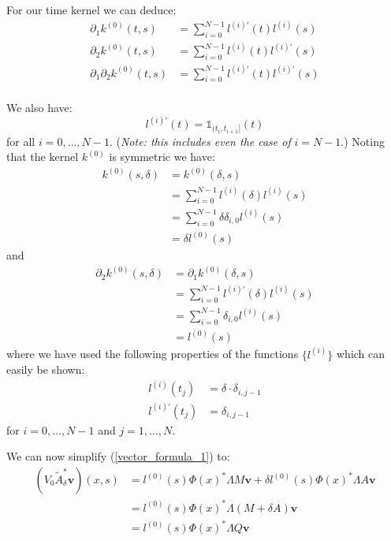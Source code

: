 \documentclass{article}
\theoremstyle{definition}
\theoremstyle{remark}
\theoremstyle{remark}
\begin{document}
\noindent For our time kernel we can deduce:
\begin{align}
    \partial_{1}k^{(0)}(t,s) &= \sum_{i=0}^{N-1}l^{(i)\prime}(t)l^{(i)}(s) \\
    \partial_{2}k^{(0)}(t,s) &= \sum_{i=0}^{N-1}l^{(i)}(t)l^{(i)\prime}(s) \\
    \partial_{1}\partial_{2}k^{(0)}(t,s) &= \sum_{i=0}^{N-1}l^{(i)\prime}(t)l^{(i)\prime}(s) \\
\end{align}

\noindent We also have:
\begin{equation}
    l^{(i)\prime}(t)=\mathbb{1}_{(t_{i},t_{i+1}]}(t)
\end{equation}
for all $i=0,\dots,N-1$. (\textit{Note: this includes even the case of } $i=N-1$.) Noting that the kernel $k^{(0)}$ is symmetric we have:
\begin{align*}
    k^{(0)}(s,\delta) &= k^{(0)}(\delta,s) \\
    &= \sum_{i=0}^{N-1}l^{(i)}(\delta)l^{(i)}(s) \\
    &= \sum_{i=0}^{N-1}\delta \delta_{i,0}l^{(i)}(s) \\
    &= \delta l^{(0)}(s)
\end{align*}
and
\begin{align*}
    \partial_{2}k^{(0)}(s,\delta) &= \partial_{1}k^{(0)}(\delta,s) \\
    &=\sum_{i=0}^{N-1}l^{(i)\prime}(\delta)l^{(i)}(s) \\
    &=\sum_{i=0}^{N-1}\delta_{i,0}l^{(i)}(s) \\
    &=l^{(0)}(s)
\end{align*}
where we have used the following properties of the functions $\{l^{(i)}\}$ which can easily be shown:
\begin{align}
    l^{(i)}(t_j) &= \delta\cdot\delta_{i,j-1} \\
    l^{(i)\prime}(t_j) &= \delta_{i,j-1}
\end{align}
for $i=0,\dots,N-1$ and $j=1,\dots,N$.

\noindent We can now simplify (\ref{vector_formula_1}) to:
\begin{align}
    (V_{0}\tilde{A}_{\delta}^{*}\boldsymbol{v})(x,s) &= l^{(0)}(s)\Phi(x)^{*}\Lambda M\boldsymbol{v} + \delta l^{(0)}(s)\Phi(x)^{*}\Lambda A \boldsymbol{v} \nonumber \\
    &= l^{(0)}(s)\Phi(x)^{*}\Lambda(M+\delta A)\boldsymbol{v} \nonumber \\
    \label{vector_formula_simplified_1}
    &= l^{(0)}(s)\Phi(x)^{*}\Lambda Q\boldsymbol{v}
\end{align}
\end{document}
